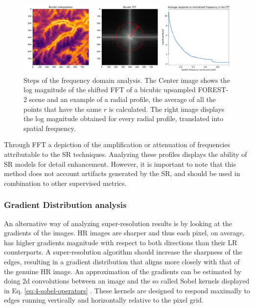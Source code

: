         \begin{figure}[H]
            \centering
            \includegraphics[width=\linewidth]{Includes/4-frequency-analysis.pdf}
            \caption{Steps of the frequency domain analysis. The Center image shows the log magnitude of the shifted FFT of a bicubic upsampled FOREST-2 scene and an example of a radial profile, the average of all the points that have the same $r$ is calculated. The right image displays the log magnitude obtained for every radial profile, translated into spatial frequency.  }
            \label{fig:4-frequency-analysis}
        \end{figure}

        Through FFT a depiction of the amplification or attenuation of frequencies attributable to the SR techniques. 
        Analyzing these profiles displays the ability of SR models for detail enhancement. 
        However, it is important to note that this method does not account artifacts generated by the SR, and should be used in combination to other supervised metrics.

        \subsubsection{Gradient Distribution analysis}


        An alternative way of analyzing super-resolution results is by looking at the gradients of the images. 
        HR images are sharper and thus each pixel, on average, has higher gradients magnitude with respect to both directions than their LR counterparts.
        A super-resolution algorithm should increase the sharpness of the edges, resulting in a gradient distribution that aligns more closely with that of the genuine HR image.
        An approximation of the gradients can be estimated by doing 2d convolutions between an image and the so called Sobel kernels displayed in Eq. \ref{eq:4-sobel-operators} \cite{Sobel1990AnI3}.
        These kernels are designed to respond maximally to edges running vertically and horizontally relative to the pixel grid.
        
